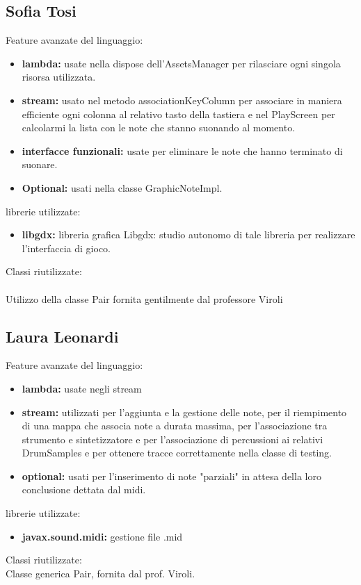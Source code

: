 \documentclass[a4paper,12pt]{report}
\begin{document}
\subsection{Sofia Tosi}
Feature avanzate del linguaggio:
\begin{itemize}
	\item \textbf{lambda:} usate nella dispose dell'AssetsManager per rilasciare ogni singola risorsa utilizzata.
	\item \textbf{stream:} usato nel metodo associationKeyColumn per associare in maniera efficiente ogni colonna al relativo tasto della tastiera e nel PlayScreen per calcolarmi la lista con le note che stanno suonando al momento.
	\item \textbf{interfacce funzionali:} usate per eliminare le note che hanno terminato di suonare.
	\item \textbf{Optional:} usati nella classe GraphicNoteImpl.
\end{itemize}
librerie utilizzate:
\begin{itemize}
	\item \textbf{libgdx:} libreria grafica Libgdx: studio autonomo di tale libreria per realizzare l'interfaccia di gioco.
\end{itemize}
Classi riutilizzate: \\ \\
Utilizzo della classe Pair fornita gentilmente dal professore Viroli
\newpage

\subsection{Laura Leonardi}
Feature avanzate del linguaggio:
\begin{itemize}
	\item \textbf{lambda:} usate negli stream
	\item \textbf{stream:} utilizzati per l'aggiunta e la gestione delle note, per il riempimento di una mappa che associa note a durata massima, per l'associazione tra strumento e sintetizzatore e per l'associazione di percussioni ai relativi DrumSamples e per ottenere tracce correttamente nella classe di testing.
	\item \textbf{optional:} usati per l'inserimento di note "parziali" in attesa della loro conclusione dettata dal midi.
\end{itemize}
librerie utilizzate:
\begin{itemize}
	\item \textbf{javax.sound.midi:} gestione file .mid
\end{itemize}
Classi riutilizzate: \\
Classe generica Pair, fornita dal prof. Viroli.
\newpage
\end{document}
